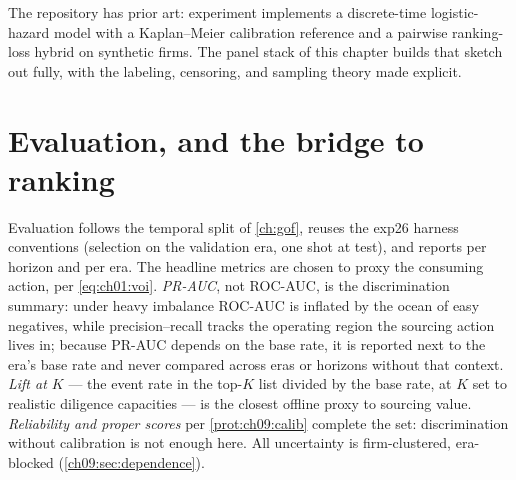 The repository has prior art: experiment  implements a
discrete-time logistic-hazard model with a Kaplan--Meier calibration
reference and a pairwise ranking-loss hybrid on synthetic firms. The
panel stack of this chapter builds that sketch out fully, with the
labeling, censoring, and sampling theory made explicit.

\section{Evaluation, and the bridge to ranking}\label{ch09:sec:eval}

Evaluation follows the temporal split of \cref{ch:gof}, reuses the exp26
harness conventions (selection on the validation era, one shot at test),
and reports per horizon and per era. The headline metrics are chosen to
proxy the consuming action, per \cref{eq:ch01:voi}. \emph{PR-AUC}, not
ROC-AUC, is the discrimination summary: under heavy imbalance ROC-AUC is
inflated by the ocean of easy negatives, while precision--recall tracks
the operating region the sourcing action lives in; because PR-AUC
depends on the base rate, it is reported next to the era's base rate
and never compared across eras or horizons without that context.
\emph{Lift at $K$} --- the event rate in the top-$K$ list divided by the
base rate, at $K$ set to realistic diligence capacities --- is the
closest offline proxy to sourcing value. \emph{Reliability and proper
scores} per \cref{prot:ch09:calib} complete the set: discrimination
without calibration is not enough here. All uncertainty is
firm-clustered, era-blocked (\cref{ch09:sec:dependence}).

